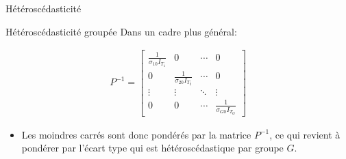 \documentclass{beamer}
\begin{document}
\begin{frame}{Hétéroscédasticité}
\begin{block}{Hétéroscédasticité groupée}
Dans un cadre plus général:

\begin{align*}
P^{-1}= \begin{bmatrix} \frac{1}{\sigma_{10}I_{T_1}} & 0 & \cdots & 0 \\
0 & \frac{1}{\sigma_{20}I_{T_2}} & \cdots & 0 \\
\vdots & \vdots & \ddots & \vdots \\
0 & 0 & \cdots & \frac{1}{\sigma_{G0}I_{T_G}}
\end{bmatrix}
\end{align*}
\begin{itemize}
\item Les moindres carrés sont donc pondérés par la matrice $P^{-1}$, ce qui revient à pondérer par l’écart type qui est hétéroscédastique par groupe $G$.
\end{itemize}
\end{block}
\end{frame}
\end{document}
